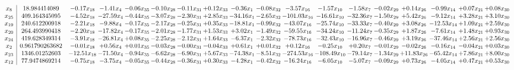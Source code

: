 \documentclass[9pt]{article}
\begin{document}
 \[\begin{array}{c| c c@{\hskip 2pt} c@{\hskip 2pt} c@{\hskip 2pt} c@{\hskip 2pt} c@{\hskip 2pt} c@{\hskip 2pt} c@{\hskip 2pt} c@{\hskip 2pt} c@{\hskip 2pt} c@{\hskip 2pt} c@{\hskip 2pt} c@{\hskip 2pt} c@{\hskip 2pt} c@{\hskip 2pt} c@{\hskip 2pt} c@{\hskip 2pt} }
 x_{8}   &  18.984414089 & -0.17 x_{18} & -1.41 x_{4} & -0.06 x_{35} & -0.10 x_{28} & -0.11 x_{31} & +  0.12 x_{33} & -0.36 x_{1} & -0.08 x_{32} & -3.57 x_{16} & -1.57 x_{10} & -1.58 x_{7} & -0.02 x_{29} & +  0.14 x_{26} & -0.99 x_{14} & +  0.07 x_{21} & +  0.08 x_{30}\\
 x_{25}   &  409.164345095 & -4.52 x_{18} & -27.59 x_{4} & -0.44 x_{35} & -3.07 x_{28} & -2.30 x_{31} & +  2.85 x_{33} & -34.16 x_{1} & -2.65 x_{32} & -101.03 x_{16} & -16.61 x_{10} & -32.36 x_{7} & -1.50 x_{29} & +  5.42 x_{26} & -9.12 x_{14} & +  3.28 x_{21} & +  3.10 x_{30}\\
 x_{19}   &  240.612200918 & -2.21 x_{18} & -9.88 x_{4} & -0.17 x_{35} & -2.17 x_{28} & -0.25 x_{31} & +  0.35 x_{33} & -18.81 x_{1} & -0.99 x_{32} & -43.07 x_{16} & -25.74 x_{10} & -33.33 x_{7} & -0.40 x_{29} & +  3.08 x_{26} & -12.53 x_{14} & +  1.09 x_{21} & +  2.59 x_{30}\\
 x_{20}   &  264.493990418 & -2.20 x_{18} & -17.82 x_{4} & -0.17 x_{35} & -2.01 x_{28} & -1.77 x_{31} & +  1.53 x_{33} & +  3.02 x_{1} & -1.49 x_{32} & -59.55 x_{16} & -34.24 x_{10} & -11.24 x_{7} & -0.35 x_{29} & +  1.87 x_{26} & -7.61 x_{14} & +  1.48 x_{21} & +  0.93 x_{30}\\
 x_{24}   &  419.628349314 & -3.91 x_{18} & -26.81 x_{4} & +  0.08 x_{35} & -2.25 x_{28} & -2.12 x_{31} & +  1.64 x_{33} & -6.37 x_{1} & -2.32 x_{32} & -78.73 x_{16} & -32.43 x_{10} & -16.96 x_{7} & -0.46 x_{29} & +  3.19 x_{26} & -37.46 x_{14} & +  2.56 x_{21} & +  2.56 x_{30}\\
 x_{2}   &  0.961790263682 & -0.01 x_{18} & +  0.56 x_{4} & +  0.01 x_{35} & -0.03 x_{28} & -0.00 x_{31} & -0.04 x_{33} & +  0.61 x_{1} & +  0.01 x_{32} & +  0.12 x_{16} & -0.25 x_{10} & +  0.20 x_{7} & -0.01 x_{29} & -0.02 x_{26} & -0.16 x_{14} & -0.04 x_{21} & +  0.03 x_{30}\\
 x_{23}   &  1346.01252603 & -12.51 x_{18} & -71.50 x_{4} & -0.94 x_{35} & -6.62 x_{28} & -6.90 x_{31} & +  5.67 x_{33} & -74.38 x_{1} & -8.51 x_{32} & -274.53 x_{16} & -108.49 x_{10} & -79.14 x_{7} & -1.34 x_{29} & + 11.83 x_{26} & -65.42 x_{14} & +  7.86 x_{21} & +  8.00 x_{30}\\
 x_{12}   &  77.9474869214 & -0.75 x_{18} & -3.75 x_{4} & -0.05 x_{35} & -0.44 x_{28} & -0.36 x_{31} & +  0.30 x_{33} & -4.28 x_{1} & -0.42 x_{32} & -16.24 x_{16} & -6.05 x_{10} & -5.07 x_{7} & -0.09 x_{29} & +  0.73 x_{26} & -4.05 x_{14} & +  0.47 x_{21} & +  0.53 x_{30}\\

\end{array}\]
\end{document}
